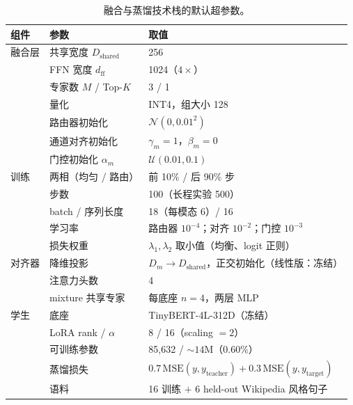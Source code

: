 \documentclass[10pt,twoside]{article}
\begin{document}
\begin{table}[h]
\centering
\caption{融合与蒸馏技术栈的默认超参数。}
\begin{tabular}{lll}
\toprule
\textbf{组件} & \textbf{参数} & \textbf{取值} \\
\midrule
融合层 & 共享宽度 $D_{\text{shared}}$ & 256 \\
 & FFN 宽度 $d_{\text{ff}}$ & 1024（$4\times$） \\
 & 专家数 $M$ / Top-$K$ & 3 / 1 \\
 & 量化 & INT4，组大小 128 \\
 & 路由器初始化 & $\mathcal{N}(0, 0.01^2)$ \\
 & 通道对齐初始化 & $\gamma_m = 1$，$\beta_m = 0$ \\
 & 门控初始化 $\alpha_m$ & $\mathcal{U}(0.01, 0.1)$ \\
\midrule
训练 & 两相（均匀 / 路由） & 前 10\% / 后 90\% 步 \\
 & 步数 & 100（长程实验 500） \\
 & batch / 序列长度 & 18（每模态 6）/ 16 \\
 & 学习率 & 路由器 $10^{-4}$；对齐 $10^{-2}$；门控 $10^{-3}$ \\
 & 损失权重 & $\lambda_1, \lambda_2$ 取小值（均衡、logit 正则） \\
\midrule
对齐器 & 降维投影 & $D_m \rightarrow D_{\text{shared}}$，正交初始化（线性版：冻结） \\
 & 注意力头数 & 4 \\
 & mixture 共享专家 & 每底座 $n = 4$，两层 MLP \\
\midrule
学生 & 底座 & TinyBERT-4L-312D（冻结） \\
 & LoRA rank / $\alpha$ & 8 / 16（scaling $= 2$） \\
 & 可训练参数 & 85{,}632 / ${\sim}14$M（$0.60\%$） \\
 & 蒸馏损失 & $0.7\,\mathrm{MSE}(y, y_{\text{teacher}}) + 0.3\,\mathrm{MSE}(y, y_{\text{target}})$ \\
 & 语料 & 16 训练 $+$ 6 held-out Wikipedia 风格句子 \\
\bottomrule
\end{tabular}
\end{table}
\end{document}
